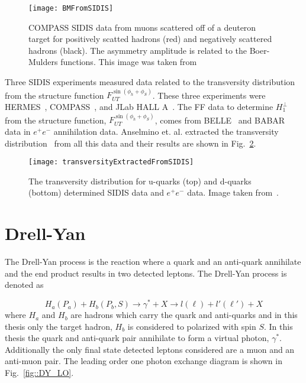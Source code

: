 \begin{figure}[h!t]
  \centering
  \texttt{[image: BMFromSIDIS]}
  \caption{COMPASS SIDIS data from muons scattered off of a deuteron target for
    positively scatted hadrons (red) and negatively scattered hadrons (black).
    The asymmetry amplitude is related to the Boer-Mulders functions.  This
    image was taken from~\cite{Adolph:2014pwc}}
  \label{fig::BMFromSIDIS}
\end{figure}

Three SIDIS experiments measured data related to the transversity distribution
from the structure function $F_{UT}^{\sin(\phi_h +\phi_S)}$.  These three
experiments were HERMES~\cite{Airapetian:2004tw,Airapetian:2010ds},
COMPASS~\cite{Ageev:2006da,Alekseev:2008aa,Alekseev:2010rw,Adolph:2012sn,Adolph:2014zba},
and JLab HALL A~\cite{PhysRevLett.107.072003}.  The FF data to determine
$H_1^{\perp }$ from the structure function, $F_{UT}^{\sin(\phi_h +\phi_S)}$,
comes from BELLE~\cite{Abe:2005zx,Seidl:2008xc} and
BABAR~\cite{TheBABAR:2013yha} data in $e^+e^-$ annihilation data.  Anselmino
et. al. extracted the transversity distribution~\cite{PhysRevD.87.094019} from
all this data and their results are shown in
Fig.~\ref{fig::transversityExtractedFromSIDIS}.

\begin{figure}[h!t]
  \centering \texttt{[image: transversityExtractedFromSIDIS]}
  \caption{The transversity distribution for u-quarks (top) and d-quarks
    (bottom) determined SIDIS data and $e^+e^-$ data.  Image taken
    from~\cite{PhysRevD.87.094019}.}
  \label{fig::transversityExtractedFromSIDIS}
\end{figure}


\section{Drell-Yan} \label{sec::DY}
The Drell-Yan process is the reaction where a quark and an anti-quark annihilate
and the end product results in two detected leptons.  The Drell-Yan process is
denoted as

\begin{equation}
  H_a(P_a) + H_b(P_b, S) \rightarrow \gamma^* + X \rightarrow l(\ell) +
  l'(\ell') + X
\end{equation}
\noindent
where $H_a$ and $H_b$ are hadrons which carry the quark and anti-quarks and in
this thesis only the target hadron, $H_b$ is considered to polarized with spin
$S$.  In this thesis the quark and anti-quark pair annihilate to form a virtual
photon, $\gamma^*$.  Additionally the only final state detected leptons
considered are a muon and an anti-muon pair.  The leading order one photon
exchange diagram is shown in Fig.~\ref{fig::DY_LO}.

